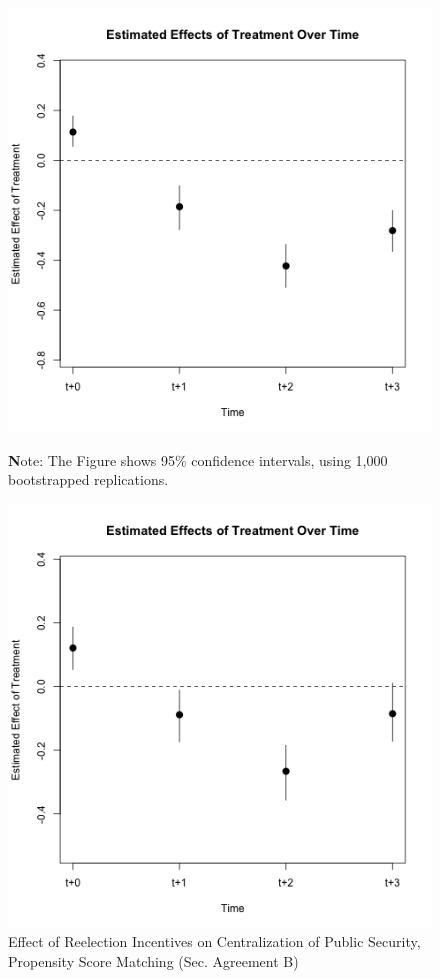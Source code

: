\documentclass[12pt]{amsart}
\numberwithin{equation}{section}
\theoremstyle{definition}
\theoremstyle{definition}
\theoremstyle{definition}
\begin{document}
\begin{appendix}
\begin{figure}[h]
      
\includegraphics[width=1\textwidth]{Figures/mando_unico_psm.png}
       
 {\textbf Note: The Figure shows 95\% confidence intervals, using 1,000 bootstrapped replications.} 
\end{figure} 

\begin{figure}[h]  
\centering
\caption{Effect of Reelection Incentives on Centralization of Public Security, Propensity Score Matching (Sec. Agreement B)} 
\label{fig:psm_acuerdo2}
   
      
\includegraphics[width=1\textwidth]{Figures/mando_unico2_psm.png}
       

\end{figure}
\end{appendix}
\end{document}
